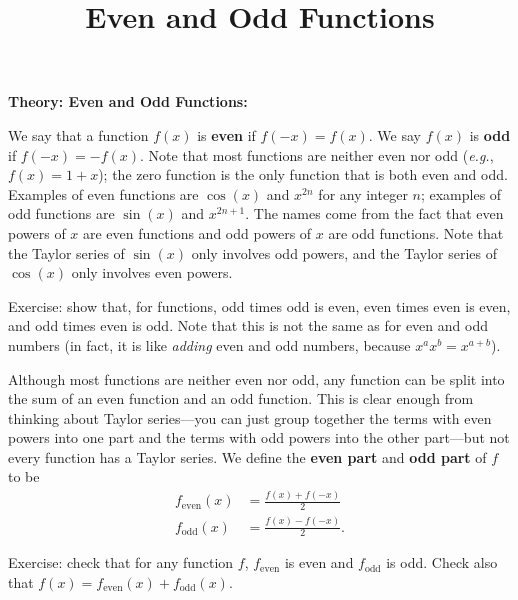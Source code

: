 \documentclass{article}
\begin{document}
\title{Even and Odd Functions}
\date{}

\maketitle
\thispagestyle{empty}






\vspace{5mm}








\textbf{Theory: Even and Odd Functions:}\bigskip


We say that a function $f(x)$ is \textbf{even} if $f(-x)=f(x)$. We say $f(x)$ is \textbf{odd} if $f(-x)=-f(x)$. Note that most functions are neither even nor odd (\textit{e.g.}, $f(x)=1+x$); the zero function is the only function that is both even and odd. Examples of even functions are $\cos(x)$ and $x^{2n}$ for any integer $n$; examples of odd functions are $\sin(x)$ and $x^{2n+1}$. The names come from the fact that even powers of $x$ are even functions and odd powers of $x$ are odd functions. Note that the Taylor series of $\sin(x)$ only involves odd powers, and the Taylor series of $\cos(x)$ only involves even powers.\medskip

Exercise: show that, for functions, odd times odd is even, even times even is even, and odd times even is odd. Note that this is not the same as for even and odd numbers (in fact, it is like \textit{adding} even and odd numbers, because $x^ax^b=x^{a+b}$).\bigskip

Although most functions are neither even nor odd, any function can be split into the sum of an even function and an odd function. This is clear enough from thinking about Taylor series---you can just group together the terms with even powers into one part and the terms with odd powers into the other part---but not every function has a Taylor series. We define the \textbf{even part} and \textbf{odd part} of $f$ to be
\begin{align*}
	f_\mathrm{even}(x) &= \frac{f(x)+f(-x)}{2}\\
	f_\mathrm{odd}(x)&= \frac{f(x)-f(-x)}{2}.
\end{align*}

\medskip

Exercise: check that for any function $f$, $f_\mathrm{even}$ is even and $f_\mathrm{odd}$ is odd. Check also that $f(x)=f_\mathrm{even}(x)+f_\mathrm{odd}(x)$.\bigskip
\end{document}
